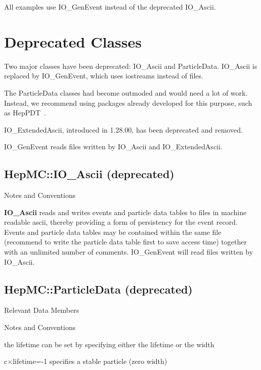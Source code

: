 \documentclass[11pt,letterpaper]{article}
\begin{document}
All examples use IO\_GenEvent instead of the deprecated IO\_Ascii.

%
%

\section{Deprecated Classes}

Two major classes have been deprecated: IO\_Ascii and ParticleData.
IO\_Ascii is replaced by IO\_GenEvent, which uses iostreams instead of files.

The ParticleData classes had become outmoded and would need a lot of
work.  Instead, we recommend using packages already developed for this
purpose, such as HepPDT~\cite{heppdt}.

IO\_ExtendedAscii, introduced in 1.28.00, has been deprecated and removed.

IO\_GenEvent reads files written by IO\_Ascii and IO\_ExtendedAscii.

%
%

\subsection{HepMC::IO\_Ascii (deprecated)}

\begin{myitemize}{Notes and Conventions}
 \item {\bf IO\_Ascii} reads and writes events and particle data
    tables to files in machine readable ascii, thereby providing a
    form of persistency for the event record. Events and particle data
    tables may be contained within the same file (recommend to write
    the particle data table first to save access time) together with
    an unlimited number of comments. 
   IO\_GenEvent will read files written by IO\_Ascii.
\end{myitemize}

%
%

\subsection{HepMC::ParticleData (deprecated)}

\begin{myitemize}{Relevant Data Members}
\end{myitemize}
\begin{myitemize}{Notes and Conventions}
  \item the lifetime can be set by specifying either 
    the lifetime or the width
  \item c$\times$lifetime=-1 specifies a stable particle (zero width)
\end{myitemize}
\end{document}
